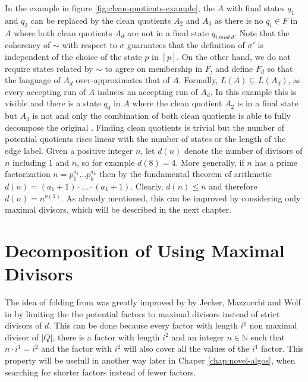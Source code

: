 In the example in figure \ref{fig:clean-quotients-example}, the \DFA $A$ with final states $q_1$ and $q_3$ can be replaced by the clean quotients $A_2$ and $A_3$ as there is no $q_i \in F$ in $A$ where both clean quotients $A_d$ are not in a final state $q_{i ~mod~ d}$. Note that the coherency of $\sim$ with respect to $\sigma$ guarantees that the definition of $\sigma'$ is independent of the choice of the state $p$ in $[p]$. On the other hand, we do not require states related by $\sim$ to agree on membership in $F$, and define $F_d$ so that the language of $A_d$ over-approximates that of $A$. Formally, $L(A) \subseteq L(A_d)$, as every accepting run of $A$ induces an accepting run of $A_d$. In this example this is visible and there is a state $q_0$ in $A$ where the clean quotient $A_2$ is in a final state but $A_3$ is not and only the combination of both clean quotients is able to fully decompose the original \DFA. Finding clean quotients is trivial but the number of potential quotients rises linear with the number of states or the length of the edge label. Given a positive integer $n$, let $d(n)$ denote the number of divisors of $n$ including 1 and $n$, so for example $d(8)=4$. More generally, if $n$ has a prime factorization $n = p_1^{a_1} \ldots p_k^{a_k}$ then by the fundamental theorem of arithmetic $d(n) = (a_1+1) \cdot \ldots \cdot (a_k+1)$. Clearly, $d(n) \leq n$ and therefore $d(n) = n^{o(1)}$. As already mentioned, this can be improved by considering only maximal divisors, which will be described in the next chapter.

\section{Decomposition of \DFAs Using Maximal Divisors}
\label{ch:analysis:max-divisors}
The idea of folding \DFAs from \cite{prime-languages} was greatly improved by by Jecker, Mazzocchi and Wolf in \cite{DBLP:journals/corr/abs-2107-04683} by limiting the the potential factors to maximal divisors instead of strict divisors of $d$. This can be done because every factor with length $i^1$ non maximal divisor of $|Q|$, there is a factor with length $i^2$ and an integer $n \in \mathbb{N}$ such that $n \cdot i^1 = i^2$ and the factor with $i^2$ will also cover all the values of the $i^1$ factor. This property will be usefull in another way later in Chaper \ref{chap:novel-algos}, when searching for shorter factors instead of fewer factors.

